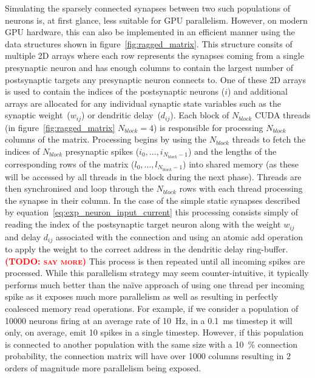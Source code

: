 \documentclass[utf8]{frontiersSCNS} %
\newcommand{\todo}[1]{\textbf{\textsc{\textcolor{red}{(TODO: #1)}}}}
\begin{document}
Simulating the sparsely connected synapses between two such populations of neurons is, at first glance, less suitable for GPU parallelism.
However, on modern GPU hardware, this can also be implemented in an efficient manner using the data structures shown in figure~\ref{fig:ragged_matrix}.
This structure consits of multiple 2D arrays where each row represents the synapses coming from a single presynaptic neuron and has enough columns to contain the largest number of postsynaptic targets any presynaptic neuron connects to.
One of these 2D arrays is used to contain the indices of the postsynaptic neurons ($i$) and additional arrays are allocated for any individual synaptic state variables such as the synaptic weight~($w_{ij}$) or dendritic delay~($d_{ij}$).
Each block of $N_{block}$ CUDA threads (in figure~\ref{fig:ragged_matrix} $N_{block}=4$) is responsible for processing $N_{block}$ columns of the matrix.
Processing begins by using the $N_{block}$ threads to fetch the indices of $N_{block}$ presynaptic spikes ($i_{0},\ldots,i_{N_{block} - 1}$) and the lengths of the corresponding rows of the matrix ($l_{0},\ldots,l_{N_{block} - 1}$) into shared memory (as these will be accessed by all threads in the block during the next phase).
Threads are then synchronised and loop through the $N_{block}$ rows with each thread processing the synapse in their column.
In the case of the simple static synapses described by equation~\ref{eq:exp_neuron_input_current} this processing consists simply of reading the index of the postsynaptic target neuron along with the weight $w_{ij}$ and delay $d_{ij}$ associated with the connection and using an atomic add operation to apply the weight to the correct address in the dendritic delay ring-buffer.\todo{say more}
This process is then repeated until all incoming spikes are processed.
While this parallelism strategy may seem counter-intuitive, it typically performs much better than the naïve approach of using one thread per incoming spike as it exposes much more parallelism as well as resulting in perfectly coalesced memory read operations.
For example, if we consider a population of \num{10000} neurons firing at an average rate of \SI{10}{\hertz}, in a \SI{0.1}{\milli\second} timestep it will only, on average, emit \num{10} spikes in a single timestep.
However, if this population is connected to another population with the same size with a \SI{10}{\percent} connection probability, the connection matrix will have over \num{1000} columns resulting in 2 orders of magnitude more parallelism being exposed.
\end{document}
